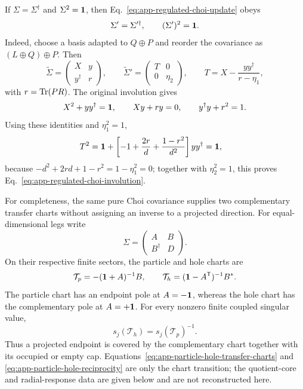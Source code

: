 If \(\Sigma=\Sigma^\dagger\) and \(\Sigma^2=\mathbf{1}\), then
Eq.~\eqref{eq:app-regulated-choi-update} obeys
\begin{equation}
    \Sigma'=\Sigma'^\dagger,
    \qquad
    (\Sigma')^2=\mathbf{1} .
    \label{eq:app-regulated-choi-involution}
\end{equation}
Indeed, choose a basis adapted to \(Q\oplus P\) and reorder the covariance as
\((L\oplus Q)\oplus P\).  Then
\begin{equation}
    \widetilde\Sigma=
    \begin{pmatrix}X&y\\y^\dagger&r\end{pmatrix},
    \qquad
    \widetilde\Sigma'=
    \begin{pmatrix}T&0\\0&\eta_2\end{pmatrix},
    \qquad
    T=X-\frac{yy^\dagger}{r-\eta_1},
    \label{eq:app-choi-involution-proof-blocks}
\end{equation}
with \(r=\operatorname{Tr}(PR)\).  The original involution gives
\begin{equation}
    X^2+yy^\dagger=\mathbf{1},
    \qquad Xy+ry=0,
    \qquad y^\dagger y+r^2=1 .
\end{equation}
Using these identities and \(\eta_1^2=1\),
\begin{align}
    T^2
    &=\mathbf{1}+\left[-1+\frac{2r}{d}
      +\frac{1-r^2}{d^2}\right]yy^\dagger
      =\mathbf{1},
    \label{eq:app-choi-Schur-involution}
\end{align}
because \(-d^2+2rd+1-r^2=1-\eta_1^2=0\); together with
\(\eta_2^2=1\), this proves Eq.~\eqref{eq:app-regulated-choi-involution}.

For completeness, the same pure Choi covariance supplies two complementary
transfer charts without assigning an inverse to a projected direction.  For
equal-dimensional legs write
\begin{equation}
    \Sigma=\begin{pmatrix}A&B\\B^\dagger&D\end{pmatrix}.
\end{equation}
On their respective finite sectors, the particle and hole charts are
\begin{equation}
    \mathcal T_p=-(\mathbf{1}+A)^{-1}B,
    \qquad
    \mathcal T_h=(\mathbf{1}-A^{\mathsf T})^{-1}B^* .
    \label{eq:app-particle-hole-transfer-charts}
\end{equation}
The particle chart has an endpoint pole at \(A=-\mathbf{1}\), whereas the hole chart
has the complementary pole at \(A=+\mathbf{1}\).  For every nonzero finite coupled
singular value,
\begin{equation}
    s_j(\mathcal T_h)=s_j(\mathcal T_p)^{-1}.
    \label{eq:app-particle-hole-reciprocity}
\end{equation}
Thus a projected endpoint is covered by the complementary chart together
with its occupied or empty cap.  Equations~\eqref{eq:app-particle-hole-transfer-charts}
and \eqref{eq:app-particle-hole-reciprocity} are only the chart transition;
the quotient-core and radial-response data are given below and are not
reconstructed here.

